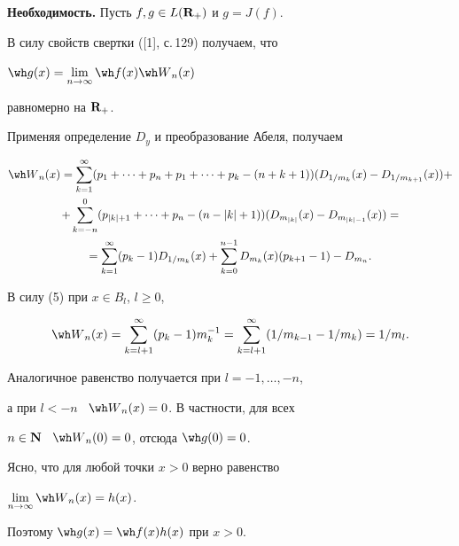\begin{pf}


{\bf Необходимость.} Пусть $f,g\in L({\bold R}_+)$ и $g=J(f)$.


В силу свойств свертки ([1], с.\,129) получаем, что


${\wh g}(x)=\lim \limits_{n\to\infty}{\wh f}(x){\wh W}_n(x)$ 


равномерно на ${\bold R}_+$. 


Применяя определение $D_y$ и преобразование Абеля, получаем


\begin{multline*}


{\wh W}_n(x)=\sum^{\infty}_{k=1}(p_1+\dotsb+p_n+p_1+\dotsb+


p_k-(n+k+1))(D_{1/m_k}(x)-D_{1/m_{k+1}}(x))+ \\


%


+\sum^0_{k=-n}(p_{|k|+1}+\dotsb+p_n-(n-|k|+1))(D_{m_{|k|}}(x)-


D_{m_{|k|-1}}(x))= \\


%


=\sum^{\infty}_{k=1}(p_k-1)D_{1/m_k}(x)+


\sum^{n-1}_{k=0}D_{m_k}(x)(p_{k+1}-1)- D_{m_n}.


\end{multline*}


В силу (5) при $x\in B_l$, $l\geq 0$,


\begin{equation}


{\wh W}_n(x)=\sum_{k=l+1}^{\infty}(p_k-1)m_k^{-1}=


\sum_{k=l+1}^{\infty}(1/m_{k-1}-1/m_k)=1/m_l.


\end{equation}





Аналогичное равенство получается при $l=-1,\dotsc, -n$,


а при $l<-n$ \ ${\wh W}_n(x)=0$. В частности, для всех


$n\in {\bold N}$ \ ${\wh W}_n(0)=0$, отсюда ${\wh g}(0)=0$.


Ясно, что для любой точки $x>0$ верно равенство


$\lim \limits_{n\to\infty}{\wh W}_n(x)=h(x)$.


Поэтому ${\wh g}(x)={\wh f}(x)h(x)$ при $x>0$.


\smallskip






\end{pf}
